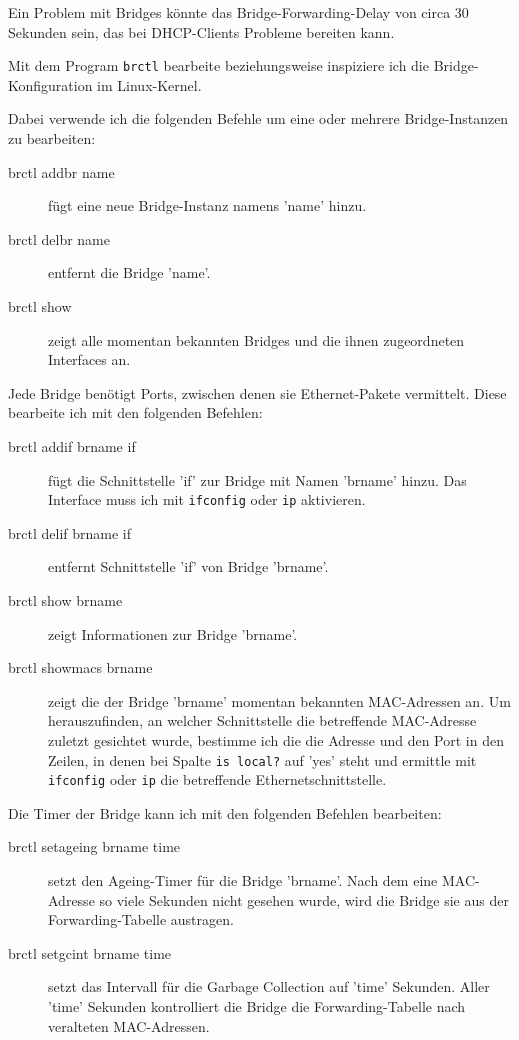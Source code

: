 \begin{normaltext}
  Ein Problem mit Bridges könnte das Bridge-Forwarding-Delay von circa 30
  Sekunden sein, das bei DHCP-Clients Probleme bereiten kann.

  Mit dem Program \verb?brctl? bearbeite beziehungsweise inspiziere ich
  die Bridge-Konfiguration im Linux-Kernel.

  Dabei verwende ich die folgenden Befehle um eine oder mehrere
  Bridge-Instanzen zu bearbeiten:
  \begin{description}
    \item[brctl addbr name] fügt eine neue Bridge-Instanz namens 'name' hinzu.
    \item[brctl delbr name] entfernt die Bridge 'name'.
    \item[brctl show] zeigt alle momentan bekannten Bridges und die ihnen
      zugeordneten Interfaces an.
  \end{description}

  Jede Bridge benötigt Ports, zwischen denen sie Ethernet-Pakete vermittelt.
  Diese bearbeite ich mit den folgenden Befehlen:
  \begin{description}
    \item[brctl addif brname if] fügt die Schnittstelle 'if' zur Bridge
      mit Namen 'brname' hinzu. Das Interface muss ich mit \verb?ifconfig?
      oder \verb?ip? aktivieren.
    \item[brctl delif brname if] entfernt Schnittstelle 'if' von Bridge
      'brname'.
    \item[brctl show brname] zeigt Informationen zur Bridge 'brname'.
    \item[brctl showmacs brname] zeigt die der Bridge 'brname' momentan
      bekannten MAC-Adressen an. Um herauszufinden, an welcher Schnittstelle
      die betreffende MAC-Adresse zuletzt gesichtet wurde, bestimme ich die
      die Adresse und den Port in den Zeilen, in denen bei Spalte
      \verb!is local?! auf 'yes' steht und ermittle mit \verb?ifconfig? oder
      \verb?ip? die betreffende Ethernetschnittstelle.
  \end{description}

  Die Timer der Bridge kann ich mit den folgenden Befehlen bearbeiten:
  \begin{description}
    \item[brctl setageing brname time] setzt den Ageing-Timer für die Bridge
      'brname'. Nach dem eine MAC-Adresse so viele Sekunden nicht gesehen
      wurde, wird die Bridge sie aus der Forwarding-Tabelle austragen.
    \item[brctl setgcint brname time] setzt das Intervall für die Garbage
      Collection auf 'time' Sekunden. Aller 'time' Sekunden kontrolliert die
      Bridge die Forwarding-Tabelle nach veralteten MAC-Adressen.
  \end{description}


\end{normaltext}
